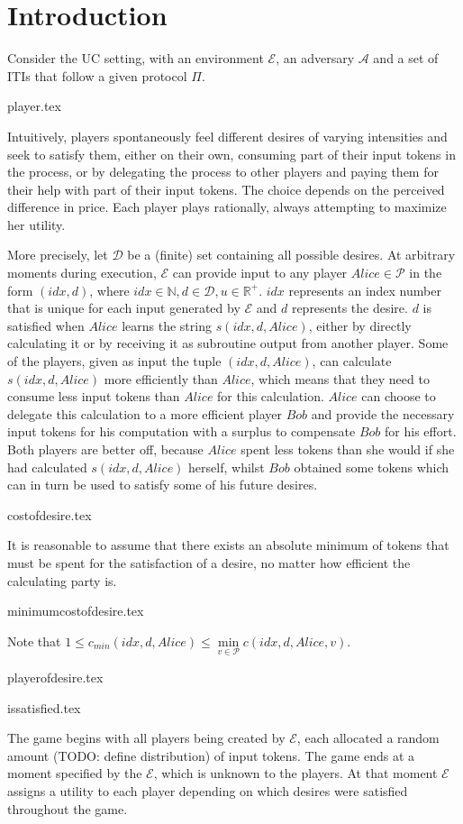 \section{Introduction}
  Consider the UC setting, with an environment $\mathcal{E}$, an adversary $\mathcal{A}$ and a set of ITIs that follow a
  given protocol $\Pi$.

  {player.tex}

  Intuitively, players spontaneously feel different desires of varying intensities and seek to satisfy them, either on their
  own, consuming part of their input tokens in the process, or by delegating the process to other players and paying them for
  their help with part of their input tokens. The choice depends on the perceived difference in price. Each player plays
  rationally, always attempting to maximize her utility.
  
  More precisely, let $\mathcal{D}$ be a (finite) set containing all possible desires. At arbitrary moments during execution,
  $\mathcal{E}$ can provide input to any player $Alice \in \mathcal{P}$ in the form $\left(idx, d\right)$, where $idx \in
  \mathbb{N}, d \in \mathcal{D}, u \in \mathbb{R}^{+}$. $idx$ represents an index number that is unique for each input
  generated by $\mathcal{E}$ and $d$ represents the desire. $d$ is satisfied when $Alice$ learns the string $s\left(idx, d,
  Alice\right)$, either by directly calculating it or by receiving it as subroutine output from another player. Some of the
  players, given as input the tuple $\left(idx, d, Alice\right)$, can calculate $s\left(idx, d, Alice\right)$ more efficiently
  than $Alice$, which means that they need to consume less input tokens than $Alice$ for this calculation. $Alice$ can choose
  to delegate this calculation to a more efficient player $Bob$ and provide the necessary input tokens for his computation with
  a surplus to compensate $Bob$ for his effort. Both players are better off, because $Alice$ spent less tokens than she would
  if she had calculated $s\left(idx, d, Alice\right)$ herself, whilst $Bob$ obtained some tokens which can in turn be used to
  satisfy some of his future desires.

  {costofdesire.tex}

  It is reasonable to assume that there exists an absolute minimum of tokens that must be spent for the satisfaction of a
  desire, no matter how efficient the calculating party is.

  {minimumcostofdesire.tex}

  \noindent Note that $1 \leq c_{min}\left(idx, d, Alice\right) \leq \min\limits_{v \in \mathcal{P}}{c\left(idx, d, Alice,
  v\right)}$.

  {playerofdesire.tex}

  {issatisfied.tex}

  The game begins with all players being created by $\mathcal{E}$, each allocated a random amount (TODO: define distribution)
  of input tokens. The game ends at a moment specified by the $\mathcal{E}$, which is unknown to the players. At that moment
  $\mathcal{E}$ assigns a utility to each player depending on which desires were satisfied throughout the game.

